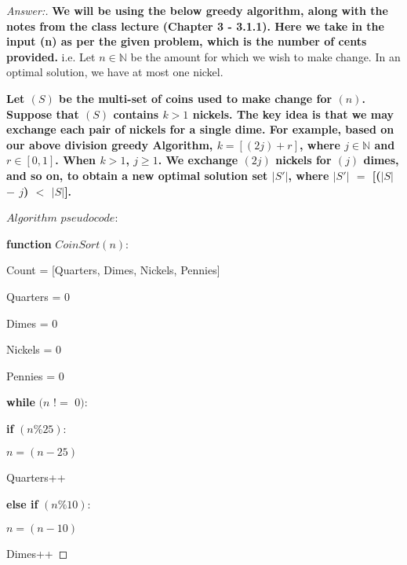 \documentclass[11pt]{article}
\theoremstyle{definition}
\theoremstyle{definition}
\theoremstyle{definition}
\begin{document}
\begin{proof}[Answer:]
\item \textbf{We will be using the below greedy algorithm, along with the notes from the class lecture (Chapter 3 - 3.1.1). Here we take in the input (n) as per the given problem, which is the number of cents provided.} i.e. Let $n \in \mathbb{N}$  be the amount for which we wish to make change. In an optimal solution, we have at most one nickel.
\\
\item \textbf{Let $(S)$ be the multi-set of coins used to make change for $(n)$. Suppose that $(S)$ contains $k > 1$ nickels. The key idea is that we may exchange each pair of nickels for a single dime. For example, based on our above division greedy Algorithm, $k = [(2j) + r]$, where $j \in \mathbb{N}$ and $r \in{[0,1]}$. When $k > 1$, $j \geq 1$. We exchange $(2j)$ nickels for $(j)$ dimes, and so on, to obtain a new optimal solution set $|$$S'$$|$, where $|$$S'$$|$ $=$ [($|$$S$$|$ $-$ $j$) $<$ $|$$S$$|$].} \\

\item $Algorithm$ $pseudocode:$ \\

\item \textbf{function} $CoinSort(n):$										
	\item	\hspace*{10mm} Count = [Quarters, Dimes, Nickels, Pennies]
	\item	\hspace*{10mm} Quarters = 0
	\item	\hspace*{10mm} Dimes = 0
	\item	\hspace*{10mm} Nickels = 0
	\item	\hspace*{10mm} Pennies = 0

	\item	\hspace*{10mm} \textbf{while} $(n$ $!=$ $0):$
	
		\item	\hspace*{20mm} \textbf{if} $(n \% 25):$
			\item	\hspace*{30mm} $n = (n-25)$
			\item	\hspace*{30mm} Quarters++
			
		\item	\hspace*{20mm} \textbf{else if} $(n \% 10):$
			\item	\hspace*{30mm} $n = (n-10)$
			\item	\hspace*{30mm} Dimes++


\end{proof}
\end{document}
